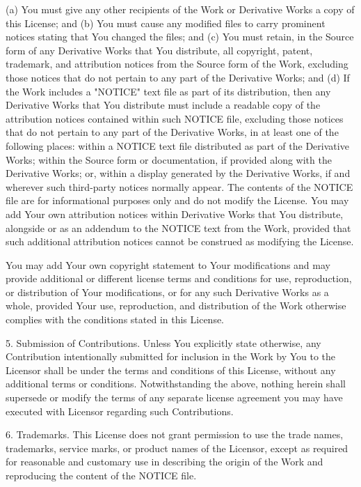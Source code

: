 \begin{DoxyVerb}
 (a) You must give any other recipients of the Work or
 Derivative Works a copy of this License; and
 (b) You must cause any modified files to carry prominent notices
 stating that You changed the files; and
 (c) You must retain, in the Source form of any Derivative Works
 that You distribute, all copyright, patent, trademark, and
 attribution notices from the Source form of the Work,
 excluding those notices that do not pertain to any part of
 the Derivative Works; and
 (d) If the Work includes a "NOTICE" text file as part of its
 distribution, then any Derivative Works that You distribute must
 include a readable copy of the attribution notices contained
 within such NOTICE file, excluding those notices that do not
 pertain to any part of the Derivative Works, in at least one
 of the following places: within a NOTICE text file distributed
 as part of the Derivative Works; within the Source form or
 documentation, if provided along with the Derivative Works; or,
 within a display generated by the Derivative Works, if and
 wherever such third-party notices normally appear. The contents
 of the NOTICE file are for informational purposes only and
 do not modify the License. You may add Your own attribution
 notices within Derivative Works that You distribute, alongside
 or as an addendum to the NOTICE text from the Work, provided
 that such additional attribution notices cannot be construed
 as modifying the License.

 You may add Your own copyright statement to Your modifications and
 may provide additional or different license terms and conditions
 for use, reproduction, or distribution of Your modifications, or
 for any such Derivative Works as a whole, provided Your use,
 reproduction, and distribution of the Work otherwise complies with
 the conditions stated in this License.

 5. Submission of Contributions. Unless You explicitly state otherwise,
 any Contribution intentionally submitted for inclusion in the Work
 by You to the Licensor shall be under the terms and conditions of
 this License, without any additional terms or conditions.
 Notwithstanding the above, nothing herein shall supersede or modify
 the terms of any separate license agreement you may have executed
 with Licensor regarding such Contributions.

 6. Trademarks. This License does not grant permission to use the trade
 names, trademarks, service marks, or product names of the Licensor,
 except as required for reasonable and customary use in describing the
 origin of the Work and reproducing the content of the NOTICE file.


\end{DoxyVerb}
